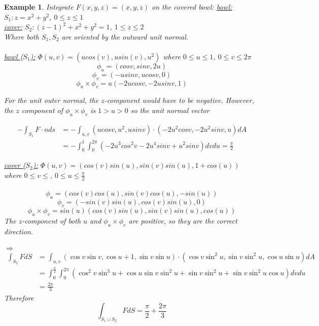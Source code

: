 \documentclass[12pt]{article}
\theoremstyle{plain}
\newtheorem{example}[theorem]{Example}
\theoremstyle{definition}
\begin{document}
\begin{example}
	Integrate $F(x,y,z) = (x,y,z)$ on the covered bowl:
	\underline{bowl:} $S_1 : z = x^2 + y^2$, $0 \leq z \leq 1$\\
	\underline{cover:} $S_2 : (z-1)^2 + x^2 + y^2 =1$, $1 \leq z \leq 2$\\
	Where both $S_1, S_2$ are oriented by the outward unit normal.\\
	\\
	\underline{bowl ($S_1$):} $\Phi (u,v) = (ucos(v), usin(v), u^2)$ where $0 \leq u \leq 1$, $0 \leq v \leq 2 \pi$
	$$\phi_u = (cosv, sinv, 2u)$$
	$$\phi_v = (-usinv, ucosv, 0)$$
	$$\phi_u \times \phi_v = u(-2ucosv, -2usinv, 1)$$

	For the unit outer normal, the $z$-component would have to be negative. However, the $z$ component of $\phi_u \times \phi_v$ is $1 > u > 0$ so the unit normal vector

	\begin{align*}
		-\int_{S_1} F \cdot n ds &= - \int_{u,v} (ucosv, u^2, usinv) \cdot (-2u^2 cosv, -2u^2 sinv, u) dA\\
		&= -\int_0^1 \int_0^{2\pi} (-2u^3cos^2 v - 2u^4 sinv + u^2 sinv) dv du = \frac{\pi}{2}
	\end{align*}

	\underline{cover ($S_2$):} $\Phi (u,v) = (cos(v)sin(u), sin(v)sin(u), 1+cos(u))$ where $0\leq v \leq$, $0 \leq u \leq \frac{\pi}{2}$\\
	\\
	$$\phi_u = (cos(v)cos(u),sin(v)cos(u), -sin(u))$$
	$$\phi_v = (-sin(v)sin(u), cos(v)sin(u), 0)$$
	$$\phi_u \times \phi_v =sin(u)(cos(v)sin(u), sin(v)sin(u), cos(u))$$
	The $z$-component of both $u$ and $\phi_u \times \phi_v$ are positive, so they are the correct direction.
	\\
	\\
	$\Longrightarrow$ \begin{align*}
		\int_{S_2} F dS &= \int_{u,v} (\cos v \sin v, \cos u + 1, \sin v \sin u)\cdot (\cos v \sin^2 u, \sin v \sin^2 u, \cos u \sin u) dA\\
		&= \int_0^{\frac{\pi}{2}} \int^{2\pi}_0 (\cos^2 v \sin^3 u + \cos u \sin v \sin^2 u + \sin v \sin^2 u + \sin v \sin^2 u \cos u) dv du\\
		&= \frac{2\pi}{3}
\end{align*}
Therefore $$\int_{S_1 \cup S_2} F dS = \frac{\pi}{2} + \frac{2\pi}{3}$$
\end{example}

\newpage
\end{document}
